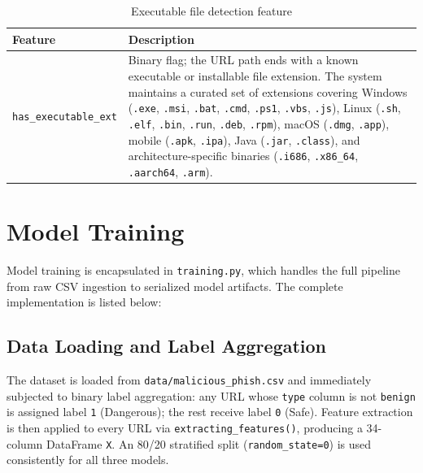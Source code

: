 \documentclass[12pt,a4paper]{article}
\begin{document}
\begin{table}[H]
    \centering
    \begin{tabularx}{\textwidth}{l >{\raggedright\arraybackslash}X}
        \toprule
        \textbf{Feature} & \textbf{Description} \\
        \midrule
        \texttt{has\_executable\_ext} & Binary flag; the URL path ends with a known executable or installable file extension. The system maintains a curated set of extensions covering Windows (\texttt{.exe}, \texttt{.msi}, \texttt{.bat}, \texttt{.cmd}, \texttt{.ps1}, \texttt{.vbs}, \texttt{.js}), Linux (\texttt{.sh}, \texttt{.elf}, \texttt{.bin}, \texttt{.run}, \texttt{.deb}, \texttt{.rpm}), macOS (\texttt{.dmg}, \texttt{.app}), mobile (\texttt{.apk}, \texttt{.ipa}), Java (\texttt{.jar}, \texttt{.class}), and architecture-specific binaries (\texttt{.i686}, \texttt{.x86\_64}, \texttt{.aarch64}, \texttt{.arm}). \\
        \bottomrule
    \end{tabularx}
    \caption{Executable file detection feature}
    \label{tab:feat_executable}
\end{table}

\section{Model Training}
\label{sec:training}

Model training is encapsulated in \texttt{training.py}, which handles the full pipeline from raw CSV ingestion to serialized model artifacts. The complete implementation is listed below:



\subsection{Data Loading and Label Aggregation}

The dataset is loaded from \texttt{data/malicious\_phish.csv} and immediately subjected to binary label aggregation: any URL whose \texttt{type} column is not \texttt{benign} is assigned label \texttt{1} (Dangerous); the rest receive label \texttt{0} (Safe). Feature extraction is then applied to every URL via \texttt{extracting\_features()}, producing a 34-column DataFrame \texttt{X}. An 80/20 stratified split (\texttt{random\_state=0}) is used consistently for all three models.
\end{document}
